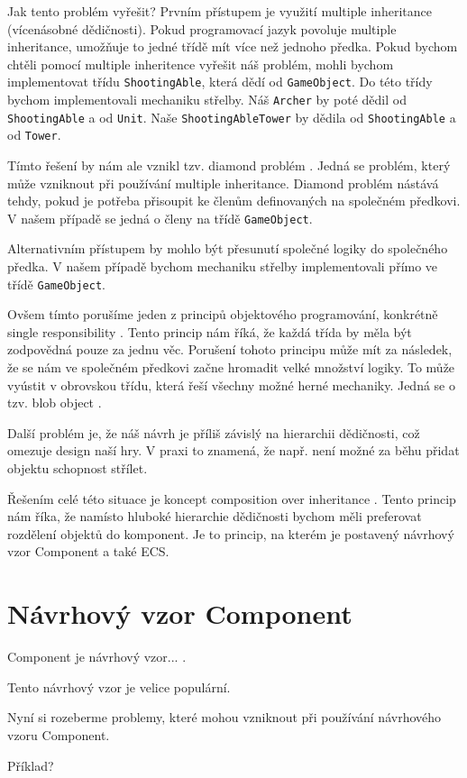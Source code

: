 Jak tento problém vyřešit? Prvním přístupem je využití multiple inheritance  (vícenásobné dědičnosti). Pokud programovací jazyk povoluje multiple inheritance, umožňuje to jedné třídě mít více než jednoho předka. Pokud bychom chtěli pomocí multiple inheritence vyřešit náš problém, mohli bychom implementovat třídu \verb|ShootingAble|, která dědí od \verb|GameObject|. Do této třídy bychom implementovali mechaniku střelby. Náš \verb|Archer| by poté dědil od \verb|ShootingAble| a od \verb|Unit|. Naše \verb|ShootingAbleTower| by dědila od \verb|ShootingAble| a od \verb|Tower|.

Tímto řešení by nám ale vznikl tzv. diamond problém . Jedná se problém, který může vzniknout při používání multiple inheritance. Diamond problém nástává tehdy, pokud je potřeba přisoupit ke členům definovaných na společném předkovi. V našem případě se jedná o členy na třídě \verb|GameObject|.

Alternativním přístupem by mohlo být přesunutí společné logiky do společného předka. V našem případě bychom mechaniku střelby implementovali přímo ve třídě \verb|GameObject|.

Ovšem tímto porušíme jeden z principů objektového programování, konkrétně single responsibility . Tento princip nám říká, že každá třída by měla být zodpovědná pouze za jednu věc. Porušení tohoto principu může mít za následek, že se nám ve společném předkovi začne hromadit velké množství logiky. To může vyústit v obrovskou třídu, která řeší všechny možné herné mechaniky. Jedná se o tzv. blob object . 

Další problém je, že náš návrh je příliš závislý na hierarchii dědičnosti, což omezuje design naší hry. V praxi to znamená, že např. není možné za běhu přidat objektu schopnost střílet.

Řešením celé této situace je koncept composition over inheritance . Tento princip nám říka, že namísto hluboké hierarchie dědičnosti bychom měli preferovat rozdělení objektů do komponent. Je to princip, na kterém je postavený návrhový vzor Component a také ECS.


\section{Návrhový vzor Component}
\label{sec:component}
Component je návrhový vzor... .

Tento návrhový vzor je velice populární.

Nyní si rozeberme problemy, které mohou vzniknout při používání návrhového vzoru Component.

Příklad?